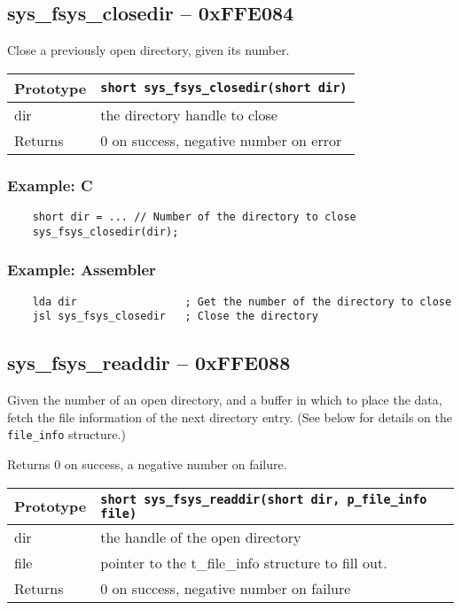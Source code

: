 \subsection*{sys\_fsys\_closedir -- 0xFFE084}
Close a previously open directory, given its number.

\bigskip

\begin{tabular}{|l||l|} \hline
Prototype & \lstinline!short sys_fsys_closedir(short dir)! \\ \hline
dir & the directory handle to close \\ \hline
Returns & 0 on success, negative number on error \\ \hline
\end{tabular}

\subsubsection*{Example: C}
\begin{lstlisting}
    short dir = ... // Number of the directory to close
    sys_fsys_closedir(dir);
\end{lstlisting}

\subsubsection*{Example: Assembler}
\begin{verbatim}
    lda dir                 ; Get the number of the directory to close
    jsl sys_fsys_closedir   ; Close the directory
\end{verbatim}


\subsection*{sys\_fsys\_readdir -- 0xFFE088}
Given the number of an open directory, and a buffer in which to place the data, fetch the file information of the next directory entry.
(See below for details on the \verb+file_info+ structure.)

Returns 0 on success, a negative number on failure.

\bigskip

\begin{tabular}{|l||l|} \hline
Prototype & \lstinline!short sys_fsys_readdir(short dir, p_file_info file)! \\ \hline
dir & the handle of the open directory \\ \hline
file & pointer to the t\_file\_info structure to fill out. \\ \hline
Returns & 0 on success, negative number on failure \\ \hline
\end{tabular}

